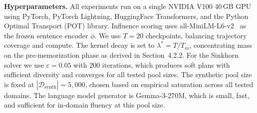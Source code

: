 \textbf{Hyperparameters.}
All experiments run on a single NVIDIA V100 40\,GB GPU using PyTorch, PyTorch Lightning, HuggingFace Transformers, and the Python Optimal Transport (POT) library.
Influence scoring uses all-MiniLM-L6-v2~\cite{reimers2019sentence,wang2020minilm} as the frozen sentence encoder $\phi$.
We use $T = 20$ checkpoints, balancing trajectory coverage and compute.
The kernel decay is set to $\lambda^* = T / T_m$, concentrating mass on the pre-memorization phase as derived in Section~4.2.2.
For the Sinkhorn solver we use $\varepsilon = 0.05$ with 200 iterations, which produces soft plans with sufficient diversity and converges for all tested pool sizes.
The synthetic pool size is fixed at $|\mathcal{D}_\text{synth}| = 5{,}000$, chosen based on empirical saturation across all tested domains.
The language model generator is Gemma-3-270M, which is small, fast, and sufficient for in-domain fluency at this pool size.
